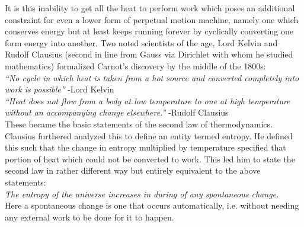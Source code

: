 \documentclass[11pt]{article} %
\numberwithin{equation}{section}
\begin{document}
It is this inability to get all the heat to perform work which poses an additional constraint for even a lower form of perpetual motion machine, namely one which conserves energy but at least keeps running forever by cyclically converting one form energy into another. Two noted scientists of the age, Lord Kelvin and Rudolf Clausius (second in line from Gauss via Dirichlet with whom he studied mathematics) formalized Carnot’s discovery by the middle of the 1800s:\\
\textit{“No cycle in which heat is taken from a hot source and converted completely into work is possible”} -Lord Kelvin\\
\textit{“Heat does not flow from a body at low temperature to one at high temperature without an accompanying change elsewhere.”} -Rudolf Clausius\\

These became the basic statements of the second law of thermodynamics. Clausius furthered analyzed this to define an entity termed entropy. He defined this such that the change in entropy multiplied by temperature specified that portion of heat which could not be converted to work. This led him to state the second law in rather different way but entirely equivalent to the above statements:\\
\textit{The entropy of the universe increases in during of any spontaneous change.}\\
Here a spontaneous change is one that occurs automatically, i.e. without needing any external work to be done for it to happen. 
 
 
\end{document}

